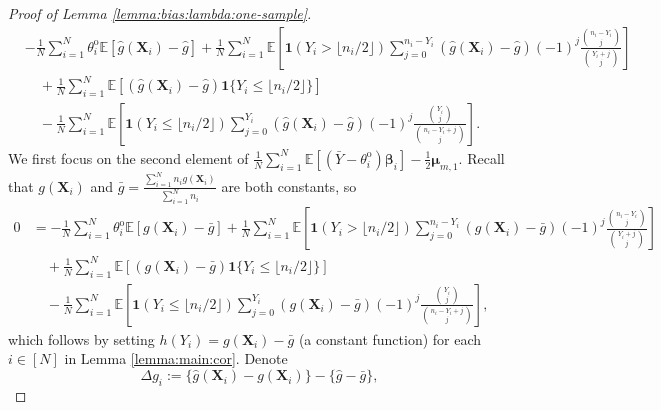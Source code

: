 \documentclass[12pt,letterpaper]{article}
\begin{document}
\begin{proof}[Proof of Lemma \ref{lemma:bias:lambda:one-sample}]
\begin{equation}\label{eq:bias:one-sample:2}
\begin{array}{rl}
&\displaystyle-\frac{1}{N}\sum_{i=1}^N\theta_i^{\mathrm{o}}\mathbb{E}\left[\hat{g}(\mathbf{X}_i)-\hat{g}\right]+\frac{1}{N}\sum_{i=1}^N\mathbb{E}\left[\mathbf{1}(Y_{i} > \lfloor n_i/2\rfloor)\!\!\!\sum_{j=0}^{n_{i}-Y_{i}}\!\!\left(\hat{g}(\mathbf{X}_i)-\hat{g}\right)(-1)^{j}\frac{\binom{n_i-Y_i}{j}}{\binom{Y_i+j}{j}}\right]\\
&\displaystyle\quad+\frac{1}{N}\sum_{i=1}^N\mathbb{E}\left[\left(\hat{g}(\mathbf{X}_i)-\hat{g}\right)\mathbf{1}\{Y_i\leq \lfloor n_i/2\rfloor\}\right]\\
&\displaystyle\quad-\frac{1}{N}\sum_{i=1}^N\mathbb{E}\left[\mathbf{1}(Y_{i}\leq \lfloor n_i/2\rfloor)\sum_{j=0}^{Y_{i}}\left(\hat{g}(\mathbf{X}_i)-\hat{g}\right)(-1)^{j}\frac{\binom{Y_i}{j}}{\binom{n_i-Y_i+j}{j}}\right].
\end{array}
\end{equation}
We first focus on the second element of $\displaystyle\frac{1}{N}\sum_{i=1}^N\mathbb{E}\left[\left(\bar{Y}-\theta_i^{\mathrm{o}}\right)\boldsymbol{\beta}_i\right]-\frac{1}{2}\boldsymbol{\mu}_{m,1}$. Recall that $g(\mathbf{X}_i)$ and $\displaystyle\bar{g}=\frac{\sum_{i=1}^Nn_ig(\mathbf{X}_i)}{\sum_{i=1}^Nn_i}$ are both constants, so 
\begin{equation}\label{eq:0:unbias:term:2}
\begin{array}{rl}
0\!\!\!\!&=\displaystyle-\frac{1}{N}\sum_{i=1}^N\theta_i^{\mathrm{o}}\mathbb{E}\left[g(\mathbf{X}_i)-\bar{g}\right]+\frac{1}{N}\sum_{i=1}^N\mathbb{E}\left[\mathbf{1}(Y_{i} > \lfloor n_i/2\rfloor)\!\!\!\sum_{j=0}^{n_{i}-Y_{i}}\!\!\left(g(\mathbf{X}_i)-\bar{g}\right)(-1)^{j}\frac{\binom{n_i-Y_i}{j}}{\binom{Y_i+j}{j}}\right]\\
&\displaystyle\quad+\frac{1}{N}\sum_{i=1}^N\mathbb{E}\left[\left(g(\mathbf{X}_i)-\bar{g}\right)\mathbf{1}\{Y_i\leq \lfloor n_i/2\rfloor\}\right]\\
&\displaystyle\quad-\frac{1}{N}\sum_{i=1}^N\mathbb{E}\left[\mathbf{1}(Y_{i}\leq \lfloor n_i/2\rfloor)\sum_{j=0}^{Y_{i}}\left(g(\mathbf{X}_i)-\bar{g}\right)(-1)^{j}\frac{\binom{Y_i}{j}}{\binom{n_i-Y_i+j}{j}}\right],
\end{array}
\end{equation}
which follows by setting $h(Y_i)=g(\mathbf{X}_i)-\bar{g}$ (a constant function) for each $i\in[N]$ in Lemma \ref{lemma:main:cor}. Denote 
$$\Delta g_i:=\{\hat{g}(\mathbf{X}_i)-g(\mathbf{X}_i)\}-\{\hat{g}-\bar{g}\},$$

\end{proof}
\end{document}
